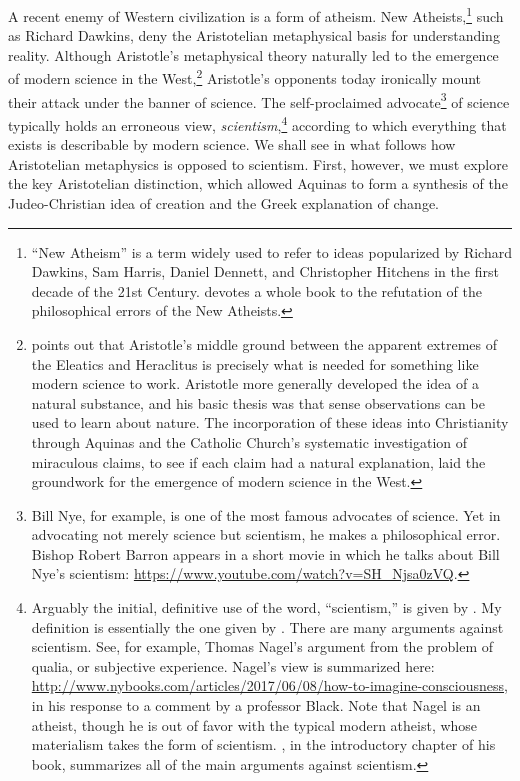 \documentclass[twocolumn]{article}
\begin{document}
A recent enemy of Western civilization is a form of atheism.  New
Atheists,\footnote{%
   ``New Atheism'' is a term widely used to refer to ideas popularized by
   Richard Dawkins, Sam Harris, Daniel Dennett, and Christopher Hitchens in the
   first decade of the 21st Century.  \cite{f2008} devotes a whole book to the
   refutation of the philosophical errors of the New Atheists.
}
such as Richard Dawkins, deny the Aristotelian metaphysical basis for
understanding reality.  Although Aristotle's metaphysical theory naturally led
to the emergence of modern science in the West,\footnote{%
   \citet[Page 36]{f2014} points out that Aristotle's middle ground between the
   apparent extremes of the Eleatics and Heraclitus is precisely what is needed
   for something like modern science to work.  Aristotle more generally
   \citep[Pages 164--171]{f2014} developed the idea of a natural substance, and
   his basic thesis was that sense observations can be used to learn about
   nature.  The incorporation of these ideas into Christianity through Aquinas
   and the Catholic Church's systematic investigation of miraculous claims, to
   see if each claim had a natural explanation, laid the groundwork for the
   emergence of modern science in the West.
}
Aristotle's opponents today ironically mount their attack under the banner of
science.  The self-proclaimed advocate\footnote{%
   Bill Nye, for example, is one of the most famous advocates of science.  Yet
   in advocating not merely science but scientism, he makes a philosophical
   error.  Bishop Robert Barron appears in a short movie in which he talks
   about Bill Nye's scientism:
   \url{https://www.youtube.com/watch?v=SH_Njsa0zVQ}.%
}
of science typically holds an erroneous view, \emph{scientism},\footnote{%
   Arguably the initial, definitive use of the word, ``scientism,'' is given by
   \cite{s1991}.  My definition is essentially the one given by \cite{h2011}.
   There are many arguments against scientism.  See, for example, Thomas
   Nagel's argument from the problem of qualia, or subjective experience.
   Nagel's view is summarized here:
   \url{http://www.nybooks.com/articles/2017/06/08/how-to-imagine-consciousness},
   in his response to a comment by a professor Black.  Note that Nagel is an
   atheist, though he is out of favor with the typical modern atheist, whose
   materialism takes the form of scientism.  \cite{f2014}, in the introductory
   chapter of his book, summarizes all of the main arguments against
   scientism.%
}
according to which everything that exists is describable by modern science.  We
shall see in what follows how Aristotelian metaphysics is opposed to scientism.
First, however, we must explore the key Aristotelian distinction, which allowed
Aquinas to form a synthesis of the Judeo-Christian idea of creation and the
Greek explanation of change.
\end{document}
